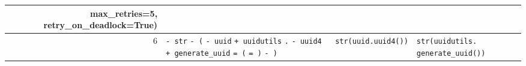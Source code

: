 \documentclass[11pt]{jreport}
\begin{document}
\begin{table}[t]
\begin{tabular}{r|p{5cm}|p{4.5cm}|p{4.5cm}}
{        max\_retries=5, 
        \newline
         retry\_on\_deadlock=True)}\\
        \hline
        6 &
        \colorbox{lightgray!50}{\texttt{- str}} \colorbox{lightgray!50}{\texttt{- (}} \colorbox{lightgray!50}{\texttt{- uuid}} 
        \newline
        \colorbox{lightgray!50}{\texttt{+ uuidutils}} \colorbox{lightgray!50}{\texttt{.}} \colorbox{lightgray!50}{\texttt{- uuid4}} 
        \newline
        \colorbox{lightgray!50}{\texttt{+ generate\_uuid}} \colorbox{lightgray!50}{\texttt{= (}} 
        \colorbox{lightgray!50}{\texttt{= )}} \colorbox{lightgray!50}{\texttt{- )}}
        &
        \texttt{str(uuid.uuid4())}
        &
        \texttt{str(uuidutils.
        \newline
        generate\_uuid())}\\
        \hline
    \end{tabular}
\end{table}

\end{document}
